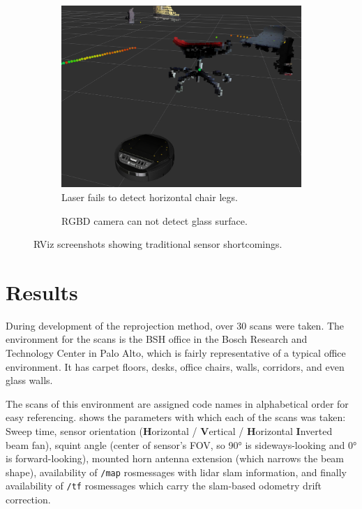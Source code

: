 \begin{figure}
    \begin{subfigure}[t]{.485\textwidth}
        \centering
        \includegraphics[max width=\textwidth]{gfx/screenshots/chair_laser_vs_rgbd}
        \caption{Laser fails to detect horizontal chair legs.}
        \label{fig:lidar_rgbd2}
    \end{subfigure}%
    \hfill%
    \begin{subfigure}[t]{.485\textwidth}
        \centering
        \def\svgwidth{\linewidth}
        
        \caption{RGBD camera can not detect glass surface.}
        \label{fig:rgbd_glasswall2}
    \end{subfigure}%
    \caption{RViz screenshots showing traditional sensor shortcomings.}
\end{figure}


\section{Results}\label{results}

During development of the reprojection method, over 30 scans were taken. The environment for the scans is the BSH office in the Bosch Research and Technology Center in Palo Alto, which is fairly representative of a typical office environment. It has carpet floors, desks, office chairs, walls, corridors, and even glass walls.

The scans of this environment are assigned code names in alphabetical order for easy referencing.  shows the parameters with which each of the scans was taken: Sweep time, sensor orientation (\textbf{H}orizontal / \textbf{V}ertical / \textbf{H}orizontal \textbf{I}nverted beam fan), squint angle (center of sensor's FOV, so \ang{90} is sideways-looking and \ang{0} is forward-looking), mounted horn antenna extension (which narrows the beam shape), availability of \texttt{/map} rosmessages with lidar slam information, and finally availability of \texttt{/tf} rosmessages which carry the slam-based odometry drift correction.

